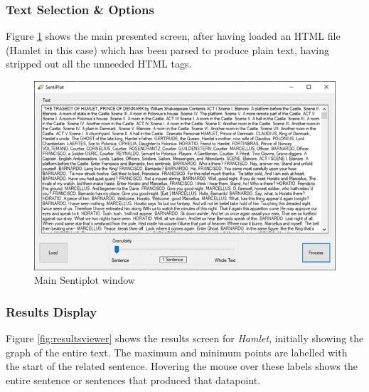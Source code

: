 \documentclass{article}
\begin{document}
    \subsubsection{Text Selection \& Options}
    Figure \ref{fig:sentiplot} shows the main presented screen, after having loaded an HTML file (Hamlet in this case) which has been parsed to produce plain text, having stripped out all the unneeded HTML tags.
        \begin{figure}[H]
            \includegraphics[width=1\textwidth]{Misc/sentiplot}
            \caption{Main Sentiplot window}
            \label{fig:sentiplot}
        \end{figure}
    \subsubsection{Results Display}
        Figure \ref{fig:resultsviewer} shows the results screen for \textit{Hamlet}, initially showing the graph of the entire text. The maximum and minimum points are labelled with the start of the related sentence. Hovering the mouse over these labels shows the entire sentence or sentences that produced that datapoint.
\end{document}
